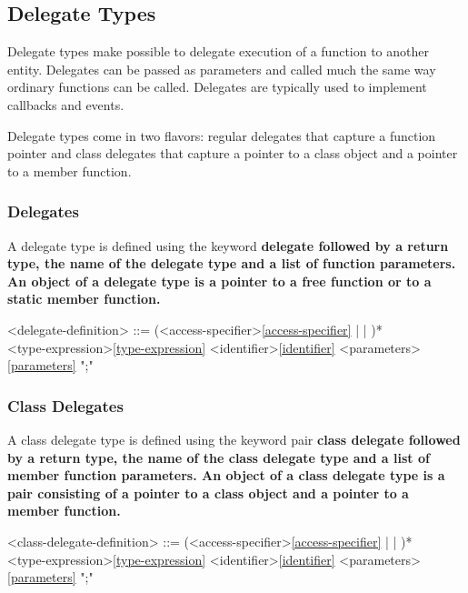 \documentclass[a4paper,oneside,11pt]{article}
\begin{document}
\subsection{Delegate Types}

Delegate types make possible to delegate execution of a function to another entity.
Delegates can be passed as parameters and called much the same way ordinary functions can be called.
Delegates are typically used to implement callbacks and events.

Delegate types come in two flavors: regular delegates that capture a function pointer and
class delegates that capture a pointer to a class object and a pointer to a member function.

\subsubsection{Delegates}

A delegate type is defined using the keyword \bf{delegate} followed by a return type, the name of the delegate type and a
list of function parameters.
An object of a delegate type is a pointer to a free function or to a static member function.

\begin{grammar}
\label{delegate-definition}<delegate-definition> ::= (<access-specifier>\ref{access-specifier} |  | )* \\
<type-expression>\ref{type-expression} <identifier>\ref{identifier} <parameters>\ref{parameters} ";"
\end{grammar}

\subsubsection{Class Delegates}

A class delegate type is defined using the keyword pair \bf{class} \bf{delegate} followed by a return type, the name of the
class delegate type and a list of member function parameters.
An object of a class delegate type is a pair consisting of a pointer to a class object and a pointer to a member function.

\begin{grammar}
\label{class-delegate-definition}<class-delegate-definition> ::= (<access-specifier>\ref{access-specifier} |  | )*  \\
<type-expression>\ref{type-expression} <identifier>\ref{identifier} <parameters>\ref{parameters} ";"
\end{grammar}
\end{document}
